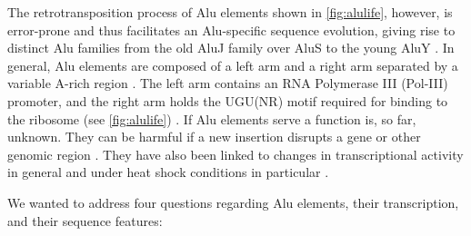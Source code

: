 The retrotransposition process of Alu elements shown in \cref{fig:alulife},
however, is error-prone and thus facilitates an Alu-specific sequence
evolution, giving rise to distinct Alu families from the old AluJ family over
AluS to the young AluY \citep{MR1991,Deininger1999,Batzer1996}. In general,
Alu elements are composed of a left arm and a right arm separated by a
variable A-rich region \citep{Evgenev2007}. The left arm contains an RNA
Polymerase III (Pol-III) promoter\label{sen:alupromo}, and the right arm holds
the UGU(NR) motif required for binding to the ribosome (see \cref{fig:alulife})
\citep{ Paolella1983,Dagan2004,A2012}. If Alu elements serve a function is,
so far, unknown. They can be harmful if a new insertion disrupts a gene or
other genomic region \citep{Deininger1999}. They have also been linked to
changes in transcriptional activity in general and under heat shock conditions
in particular \citep{Mariner2008,LL2017,Zhang2019}.

We wanted to address four questions regarding Alu elements, their
transcription, and their sequence features:

